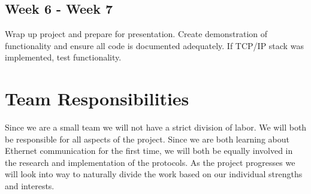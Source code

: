 \documentclass{article}
\begin{document}
\subsection*{Week 6 - Week 7}

Wrap up project and prepare for presentation. Create demonstration of functionality and ensure all code is documented adequately. If TCP/IP stack was implemented, test functionality.

\section*{Team Responsibilities}

Since we are a small team we will not have a strict division of labor. We will both be responsible for all aspects of the project. Since we are both learning about Ethernet communication for the first time, we will both be equally involved in the research and implementation of the protocols. As the project progresses we will look into way to naturally divide the work based on our individual strengths and interests.
\end{document}

